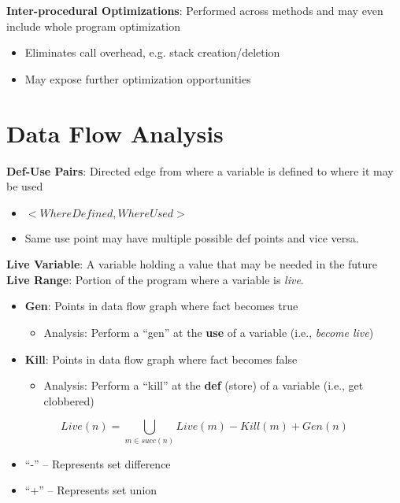 \documentclass[10pt,twocolumn]{report}
\newcommand{\red}[1]{{\color{red} #1}}
\newcommand{\green}[1]{{\color{green} #1}}
\begin{document}
  \textbf{Inter-procedural Optimizations}: Performed across methods and may even include whole program optimization
  \begin{itemize}
    \begin{itemize}
      \item Eliminates call overhead, e.g. stack creation/deletion
      \item May expose further optimization opportunities
    \end{itemize} 
  \end{itemize}

\section{Data Flow Analysis}

  \textbf{Def-Use Pairs}: Directed edge from where a variable is defined to where it may be used
  \begin{itemize}
    \item $<WhereDefined,WhereUsed>$
    \item Same use point may have multiple possible def points and vice versa.
  \end{itemize}

  \textbf{Live Variable}: A variable holding a value that may be needed in the future \\
  \textbf{Live Range}: Portion of the program where a variable is \textit{live}.

  \begin{itemize}
    \item \textbf{Gen}: Points in data flow graph where fact becomes \green{true}
    \begin{itemize}
      \item Analysis: Perform a ``gen'' at the \textbf{use} of a variable (i.e., \textit{become live})
    \end{itemize}
    \item \textbf{Kill}: Points in data flow graph where fact becomes \red{false}
    \begin{itemize}
      \item Analysis: Perform a ``kill'' at the \textbf{def} (store) of a variable  (i.e., get clobbered)
    \end{itemize}
  \end{itemize}

  \begin{equation}
    Live(n) = \bigcup_{m\in succ(n)}Live(m) - Kill(m) + Gen(n)
  \end{equation}
  \begin{itemize}
    \item ``-'' -- Represents set difference
    \item ``+'' -- Represents set union
  \end{itemize}
\end{document}
